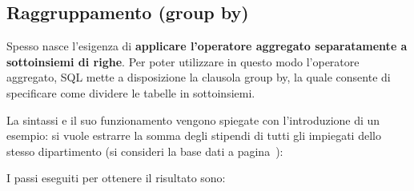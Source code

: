 \documentclass[a4paper]{article}
\begin{document}
	\subsection{Raggruppamento (\textsf{group by})}
	
	Spesso nasce l'esigenza di \textbf{applicare l'operatore aggregato separatamente a sottoinsiemi di righe}. Per poter utilizzare in questo modo l'operatore aggregato, SQL mette a disposizione la clausola \textsf{group by}, la quale consente di specificare come dividere le tabelle in sottoinsiemi.\newline
	
	\noindent
	La sintassi e il suo funzionamento vengono spiegate con l'introduzione di un esempio: si vuole estrarre la somma degli stipendi di tutti gli impiegati dello stesso dipartimento (si consideri la base dati a pagina~\pageref{img: select dbms}):
	
	I passi eseguiti per ottenere il risultato sono:
\end{document}

